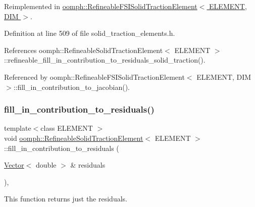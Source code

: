 Reimplemented in \hyperlink{classoomph_1_1RefineableFSISolidTractionElement_a886a6bcb5722c9535f6f78ccefdc0646}{oomph\+::\+Refineable\+F\+S\+I\+Solid\+Traction\+Element$<$ E\+L\+E\+M\+E\+N\+T, D\+I\+M $>$}.



Definition at line 509 of file solid\+\_\+traction\+\_\+elements.\+h.



References oomph\+::\+Refineable\+Solid\+Traction\+Element$<$ E\+L\+E\+M\+E\+N\+T $>$\+::refineable\+\_\+fill\+\_\+in\+\_\+contribution\+\_\+to\+\_\+residuals\+\_\+solid\+\_\+traction().



Referenced by oomph\+::\+Refineable\+F\+S\+I\+Solid\+Traction\+Element$<$ E\+L\+E\+M\+E\+N\+T, D\+I\+M $>$\+::fill\+\_\+in\+\_\+contribution\+\_\+to\+\_\+jacobian().

\mbox{\label{classoomph_1_1RefineableSolidTractionElement_a43a01cb9d3cb2bed34bc0fb811e5f830}} 
\subsubsection{\texorpdfstring{fill\+\_\+in\+\_\+contribution\+\_\+to\+\_\+residuals()}{fill\_in\_contribution\_to\_residuals()}}
{\footnotesize\ttfamily template$<$class E\+L\+E\+M\+E\+NT $>$ \\
void \hyperlink{classoomph_1_1RefineableSolidTractionElement}{oomph\+::\+Refineable\+Solid\+Traction\+Element}$<$ E\+L\+E\+M\+E\+NT $>$\+::fill\+\_\+in\+\_\+contribution\+\_\+to\+\_\+residuals (\begin{DoxyParamCaption}\item[{\hyperlink{classoomph_1_1Vector}{Vector}$<$ double $>$ \&}]{residuals }\end{DoxyParamCaption})\hspace{0.3cm}{\ttfamily [inline]}, {\ttfamily [virtual]}}



This function returns just the residuals. 



